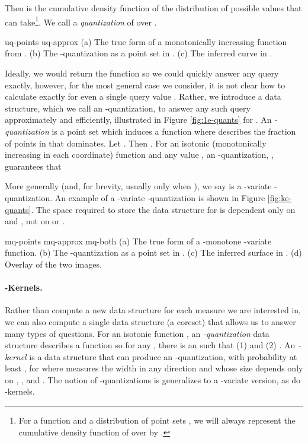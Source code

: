 \documentclass{journal}
\begin{document}
Then  is the cumulative density function of the distribution of possible values that  can take\footnote{For a function  and a distribution of point sets , we will always represent the cumulative density function of  over  by .
}.  We call  a \emph{quantization} of  over .  

 {uq-points} {uq-approx}
{ \label{fig:1e-quants}
  (a) The true form of a monotonically increasing function from .
  (b) The -quantization  as a point set in .  
  (c) The inferred curve  in .
}

Ideally, we would return the function  so we could quickly answer any query exactly, however, for the most general case we consider, it is not clear how to calculate  exactly for even a single query value .
Rather, we introduce a data structure, which we call an -quantization, to answer any such query approximately and efficiently, illustrated in Figure \ref{fig:1e-quants} for .  An \emph{-quantization} is a point set  which induces a function  where  describes the fraction of points in  that  dominates.  Let .  Then .
For an isotonic (monotonically increasing in each coordinate) function  and any value , an -quantization, , guarantees that

More generally (and, for brevity, usually only when ), we say  is a -variate -quantization.  An example of a -variate -quantization is shown in Figure \ref{fig:ke-quants}.
The space required to store the data structure for  is dependent only on  and , not on  or .

 {mq-points} {mq-approx} {mq-both}
{ \label{fig:ke-quants}
  (a) The true form of a -monotone -variate function.
  (b) The -quantization  as a point set in .
  (c) The inferred surface  in .
  (d) Overlay of the two images.
}



\paragraph{-Kernels.}
Rather than compute a new data structure for each measure we are interested in, we can also compute a single data structure (a coreset) that allows us to answer many types of questions.
For an isotonic function , an \emph{-quantization} data structure  describes a function  so for any , there is an  such that
(1)  and
(2) .
An \emph{-kernel} is a data structure that can produce an -quantization, with probability at least , for  where  measures the width in any direction and whose size depends only on , , and .
The notion of -quantizations is generalizes to a -variate version, as do -kernels. 
\end{document}

